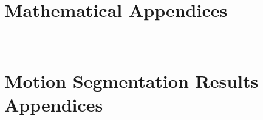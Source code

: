 \documentclass[
  12pt, 
]{book}
\begin{document}
\begin{appendices}
  \section{Mathematical Appendices}
~\label{appendix:mathematical}


  \section{Motion Segmentation Results Appendices}
~\label{appendix:moseg_additional_results}
  
\end{appendices}


\end{document}
